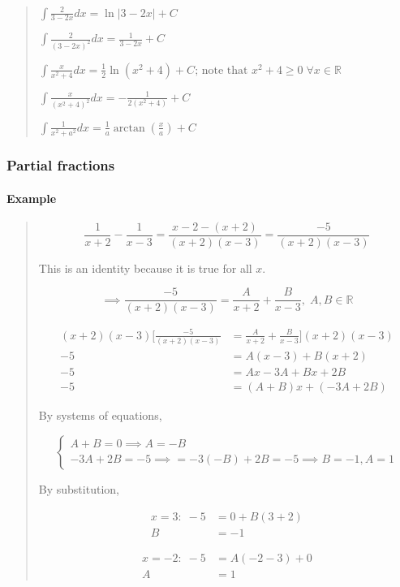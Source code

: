 \documentclass[
]{article}
\begin{document}
\begin{quote}
\(\displaystyle\int \frac{2}{3-2x}dx = \ln |3-2x| + C\)

\(\displaystyle\int \frac{2}{(3-2x)^2} dx = \frac{1}{3-2x} +C\)

\(\displaystyle\int \frac{x}{x^2 + 4} dx = \frac{1}{2}\ln(x^2+4) + C \text{; note that } x^2 + 4 \geq 0 \;\forall x \in \mathbb{R}\)

\(\displaystyle\int \frac{x}{(x^2 +4)^2} dx = -\frac{1}{2(x^2+4)} + C\)

\(\displaystyle\int \frac{1}{x^2 + a^2} dx = \frac{1}{a}\arctan \left( \frac{x}{a} \right) + C\)
\end{quote}

\hypertarget{partial-fractions}{%
\subsubsection{Partial fractions}\label{partial-fractions}}

\hypertarget{example-4}{%
\paragraph*{Example}\label{example-4}}

\begin{quote}
\[ \frac{1}{x+2} - \frac{1}{x-3} = \frac{x-2-(x+2)}{(x+2)(x-3)} = \frac{-5}{(x+2)(x-3)} \]

This is an identity because it is true for all \(x\).

\[\implies \frac{-5}{(x+2)(x-3)} = \frac{A}{x+2} + \frac{B}{x-3},\; A,B \in \mathbb{R} \]

\begin{align*} 
(x+2)(x-3) \Bigg[ \frac{-5}{(x+2)(x-3)} &= \frac{A}{x+2} + \frac{B}{x-3} \Bigg] (x+2)(x-3)\\
-5 &= A(x-3) + B(x+2)\\
-5 &= Ax -3A + Bx +2B\\
-5 &= (A+B)x + (-3A + 2B)
\end{align*}

By systems of equations,

\[
\begin{cases}
A+B = 0 \implies A = -B\\
-3A + 2B = -5 \implies = -3(-B) + 2B = -5 \implies B = -1, A = 1
\end{cases}
\]

By substitution,

\begin{align*}
x = 3: \;-5 &= 0 + B(3+2)\\
B &= -1
\end{align*}

\begin{align*}
x= -2: \; -5 &= A(-2-3) + 0\\
A &= 1
\end{align*}
\end{quote}
\end{document}
